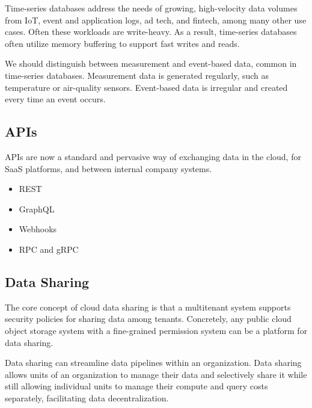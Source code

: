 \begin{enumerate}
\begin{itemize}
        Time-series databases address the needs of growing,
        high-velocity data volumes from IoT, event and application
        logs, ad tech, and fintech, among many other use cases.
        Often these workloads are write-heavy. As a result,
        time-series databases often utilize memory buffering to
        support fast writes and reads.

        We should distinguish between measurement and event-based
        data, common in time-series databases. Measurement data
        is generated regularly, such as temperature or air-quality
        sensors. Event-based data is irregular and created every
        time an event occurs.
    \end{itemize}
\end{enumerate}


\subsection*{APIs}
APIs are now a standard and pervasive way of exchanging data in
the cloud, for SaaS platforms, and between internal company
systems.

\begin{itemize}
    \item REST
    

    \item GraphQL
    

    \item Webhooks
    

    \item RPC and gRPC
\end{itemize}






\subsection*{Data Sharing}
The core concept of cloud data sharing is that a multitenant
system supports security policies for sharing data among tenants.
Concretely, any public cloud object storage system with a
fine-grained permission system can be a platform for data sharing.

Data sharing can streamline data pipelines within an organization.
Data sharing allows units of an organization to manage their data
and selectively share it while still allowing individual units to
manage their compute and query costs separately, facilitating
data decentralization.


